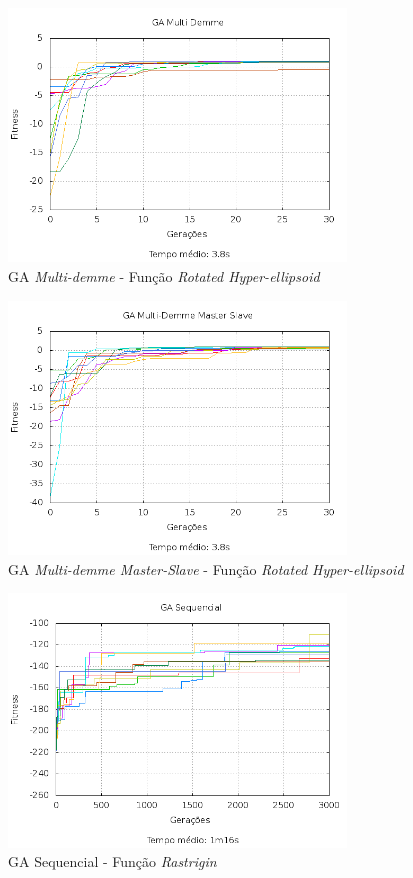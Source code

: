 \documentclass[12pt]{article}
\begin{document}
\begin{figure}[hp]
  \centering
  \includegraphics[width=0.8\textwidth]{md_f2.png}
  \caption{GA \emph{Multi-demme} - Função \emph{Rotated Hyper-ellipsoid}}
\end{figure}

\begin{figure}[hp]
  \centering
  \includegraphics[width=0.8\textwidth]{mdms_f2.png}
  \caption{GA \emph{Multi-demme Master-Slave} - Função \emph{Rotated Hyper-ellipsoid}}
\end{figure}

\begin{figure}[hp]
  \centering
  \includegraphics[width=0.8\textwidth]{seq_f3.png}
  \caption{GA Sequencial - Função \emph{Rastrigin}}
\end{figure}
\end{document}
